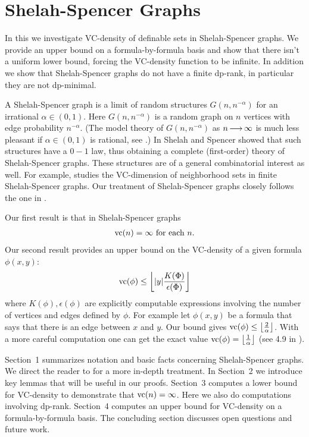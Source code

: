\chapter{Shelah-Spencer Graphs}
In this \chapa we investigate VC-density of definable sets in Shelah-Spencer graphs.
We provide an upper bound on a formula-by-formula basis and show that there isn't a uniform lower bound,
forcing the VC-density function to be infinite.
In addition we show that Shelah-Spencer graphs do not have a finite dp-rank,
in particular they are not dp-minimal.


A Shelah-Spencer graph is a limit of random structures $G(n, n^{-\alpha})$ for an irrational $\alpha \in (0,1)$.
Here $G(n, n^{-\alpha})$ is a random graph on $n$ vertices with edge probability $n^{-\alpha}$.
(The model theory of $G(n, n^{-\alpha})$ as $n \operatorname{\longrightarrow} \infty$ is much less pleasant if $\alpha \in (0,1)$ is rational, see \cite{rational}.)
In \cite{spencer} Shelah and Spencer showed that such structures have a $0-1$ law, thus obtaining
a complete (first-order) theory of Shelah-Spencer graphs.
These structures are of a general combinatorial interest as well.
For example, \cite{anthony} studies the VC-dimension of neighborhood sets in finite Shelah-Spencer graphs.
Our treatment of Shelah-Spencer graphs closely follows the one in \cite{laskowski}.

Our first result is that in Shelah-Spencer graphs
\begin{align*}
  \operatorname{vc}(n) = \infty \text{ for each } n.
\end{align*}
Our second result provides an upper bound on the VC-density of a given formula $\phi(x, y)$:
\begin{align*}
  \operatorname{vc}(\phi) \leq \left \lfloor |y|\frac{K(\Phi)}{\epsilon(\Phi)} \right \rfloor
\end{align*}
where $K(\phi), \epsilon(\phi)$ are explicitly computable expressions involving the number of vertices and edges defined by $\phi$.
For example let $\phi(x,y)$ be a formula that says that there is an edge between $x$ and $y$.
Our bound gives $\operatorname{vc}(\phi) \leq \left \lfloor \frac{2}{\alpha} \right \rfloor$.
With a more careful computation one can get the exact value $\operatorname{vc}(\phi) = \left \lfloor \frac{1}{\alpha} \right \rfloor$ (see 4.9 in \cite{density}).

Sec\-tion~1 summarizes notation and basic facts concerning Shelah-Spencer graphs.
We direct the reader to \cite{laskowski} for a more in-depth treatment.
In Sec\-tion~2 we introduce key lemmas that will be useful in our proofs.
Sec\-tion~3 computes a lower bound for VC-density to demonstrate that $\operatorname{vc}(n) = \infty$.
Here we also do computations involving dp-rank.
Sec\-tion~4 computes an upper bound for VC-density on a formula-by-formula basis.
The concluding section discusses open questions and future work.

